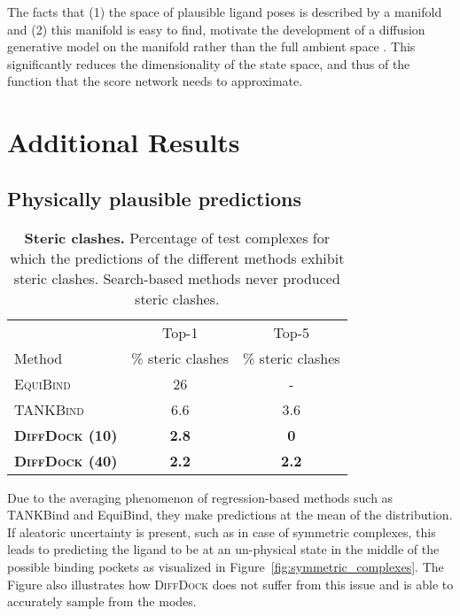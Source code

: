 \documentclass{article} \usepackage{iclr2023_conference,times}
\newenvironment{rebuttal}{}{}
\begin{document}
\begin{rebuttal}
The facts that (1) the space of plausible ligand poses is described by a manifold and (2) this manifold is easy to find, motivate the development of a diffusion generative model on the manifold rather than the full ambient space . This significantly reduces the dimensionality of the state space, and thus of the function that the score network needs to approximate. \end{rebuttal}


\section{Additional Results} \label{appx:additional_results}

\subsection{Physically plausible predictions}\label{appx:steric_clashes}

\begin{table}[htb]
    \caption{\textbf{Steric clashes.} Percentage of test complexes for which the predictions of the different methods exhibit steric clashes. Search-based methods never produced steric clashes.}
    \label{tab:steric_clashes}
     \begin{small}
     \begin{center}

    \begin{tabular}{lcc}
    \toprule
      & Top-1  & Top-5 \\
    
        Method & \% steric clashes  & \% steric clashes\\
    \midrule
    \textsc{EquiBind}           & 26  & -   \\
    \textsc{TANKBind}           & 6.6 & 3.6   \\ \midrule
    \textbf{\textsc{DiffDock} (10)}  & \textbf{2.8} & \textbf{0}  \\
    \textbf{\textsc{DiffDock} (40)}  & \textbf{2.2} & \textbf{2.2}  \\
    \bottomrule
    \end{tabular}
    \end{center}
    \end{small}
\end{table}

Due to the averaging phenomenon of regression-based methods such as TANKBind and EquiBind, they make predictions at the mean of the distribution. If aleatoric uncertainty is present, such as in case of symmetric complexes, this leads to predicting the ligand to be at an un-physical state in the middle of the possible binding pockets as visualized in Figure~\ref{fig:symmetric_complexes}. The Figure also illustrates how \textsc{DiffDock} does not suffer from this issue and is able to accurately sample from the modes.
\end{document}

